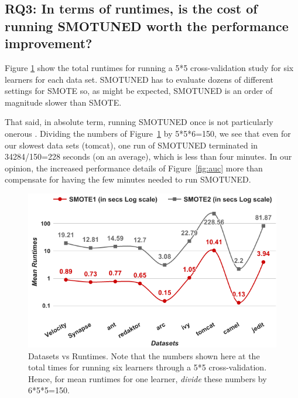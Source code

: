 \documentclass[10pt,conference]{IEEEtran}
\theoremstyle{break}
\theoremstyle{break}
\begin{document}
\subsection{{\bf RQ3:} In  terms  of  runtimes,  is  the  cost  of  running  SMOTUNED worth the performance improvement?}

Figure \ref{runtime} show the total runtimes
for running a 5*5 cross-validation study for six learners for each data set.  
SMOTUNED has to evaluate
dozens of different settings for SMOTE
so, as might be expected,  SMOTUNED is an order of magnitude slower than SMOTE. 

That said, in absolute term, running SMOTUNED once is not particularly onerous . Dividing the numbers of
Figure~\ref{runtime} by 5*5*6=150, we see that even for our slowest data sets (tomcat), one run
of SMOTUNED terminated in 34284/150=228 seconds (on an average), which is less than four minutes. In our opinion, the increased performance details of Figure~\ref{fig:auc} more than compensate for having the few minutes needed to run SMOTUNED.


\begin{figure}[!t]
  \captionsetup{justification=centering}
                                                   \includegraphics[width=\linewidth]{./fig/runtimes.png}
  \caption{Datasets vs Runtimes. Note that the numbers
  shown here at the total times for running six learners through a 5*5 cross-validation. Hence, for mean
  runtimes for one learner, {\em divide} these numbers by 6*5*5=150.}
  \label{runtime}
\vspace{-0.6cm}
\end{figure}
\end{document}
